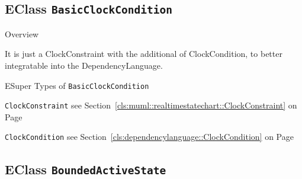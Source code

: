 \subsection{EClass \bfseries \texttt{BasicClockCondition}\normalfont}
\label{cls:dependencylanguage::BasicClockCondition} 
	
	\begin{longdescription}
		\item[Overview] 		
				

	

		It is just a ClockConstraint with the additional of ClockCondition, to better integratable into the DependencyLanguage.		
		\item[ESuper Types of \texttt{BasicClockCondition}] ~
			\begin{longdescription}
				\item[\texttt{ClockConstraint}] see Section~\ref{cls:muml::realtimestatechart::ClockConstraint} on Page~\pageref{cls:muml::realtimestatechart::ClockConstraint}							\item[\texttt{ClockCondition}] see Section~\ref{cls:dependencylanguage::ClockCondition} on Page~\pageref{cls:dependencylanguage::ClockCondition}						\end{longdescription}
		
	
	
	\end{longdescription}
	

\subsection{EClass \bfseries \texttt{BoundedActiveState}\normalfont}
\label{cls:dependencylanguage::BoundedActiveState} 
	
